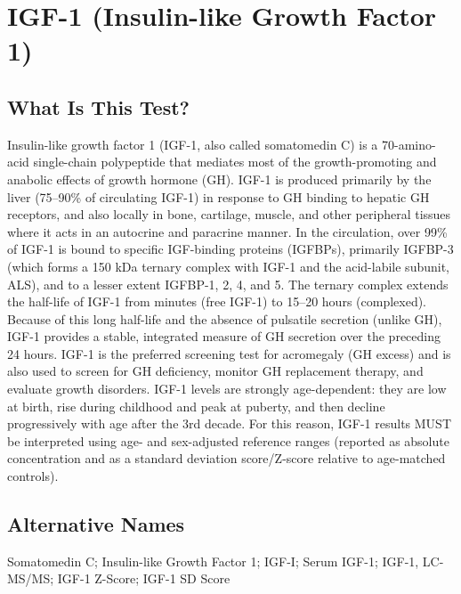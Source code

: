 \chapter{IGF-1 (Insulin-like Growth Factor 1)}

\section*{What Is This Test?}
Insulin-like growth factor 1 (IGF-1, also called somatomedin C) is a 70-amino-acid single-chain polypeptide that mediates most of the growth-promoting and anabolic effects of growth hormone (GH). IGF-1 is produced primarily by the liver (75--90\% of circulating IGF-1) in response to GH binding to hepatic GH receptors, and also locally in bone, cartilage, muscle, and other peripheral tissues where it acts in an autocrine and paracrine manner. In the circulation, over 99\% of IGF-1 is bound to specific IGF-binding proteins (IGFBPs), primarily IGFBP-3 (which forms a 150 kDa ternary complex with IGF-1 and the acid-labile subunit, ALS), and to a lesser extent IGFBP-1, 2, 4, and 5. The ternary complex extends the half-life of IGF-1 from minutes (free IGF-1) to 15--20 hours (complexed). Because of this long half-life and the absence of pulsatile secretion (unlike GH), IGF-1 provides a stable, integrated measure of GH secretion over the preceding 24 hours. IGF-1 is the preferred screening test for acromegaly (GH excess) and is also used to screen for GH deficiency, monitor GH replacement therapy, and evaluate growth disorders. IGF-1 levels are strongly age-dependent: they are low at birth, rise during childhood and peak at puberty, and then decline progressively with age after the 3rd decade. For this reason, IGF-1 results MUST be interpreted using age- and sex-adjusted reference ranges (reported as absolute concentration and as a standard deviation score/Z-score relative to age-matched controls).

\section*{Alternative Names}
Somatomedin C; Insulin-like Growth Factor 1; IGF-I; Serum IGF-1; IGF-1, LC-MS/MS; IGF-1 Z-Score; IGF-1 SD Score

